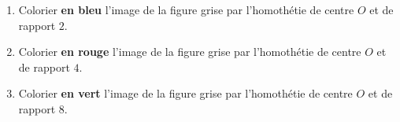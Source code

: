 \begin{exercice*}[Pavage]

    \begin{enumerate}
        \item Colorier \textbf{en bleu} l'image de la figure grise par l'homothétie de centre $O$ et de rapport $2$.
        \item Colorier \textbf{en rouge} l'image de la figure grise par l'homothétie de centre $O$ et de rapport $4$.
        \item Colorier \textbf{en vert} l'image de la figure grise par l'homothétie de centre $O$ et de rapport $8$.
    \end{enumerate}
\end{exercice*}
